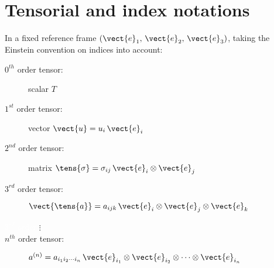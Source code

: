 \renewcommand{\arraystretch}{2.0}
\section{Tensorial and index notations}
In a fixed reference frame $ \left( \vect{e}_1 , \, \vect{e}_2 , \, \vect{e}_3  \right)$, taking the Einstein convention on indices into account:  
%
\begin{description}
\item[$0^{th}$ order tensor: ] scalar $T$ 
\item[$1^{st}$ order tensor: ] vector $\vect{u} = u_i \, \vect{e}_i  $ 
\item[$2^{nd}$ order tensor: ] matrix $\tens{ \sigma} =  \sigma_{ij}  \,\vect{e}_i \otimes \vect{e}_j$ 
\item[$3^{rd}$ order tensor: ] $\vect{\tens{a}} = a_{ijk} \, \vect{e}_i \otimes \vect{e}_j  \otimes \vect{e}_k$ 
\item[\textcolor{white}{$3^{rd}$ order } $ \vdots $]
\item[$ n^{th} $ order tensor: ]$a^{(n)} = a_{i_1 i_2 \cdots i_n} \, \vect{e}_{i_1} \otimes \vect{e}_{i_2} \otimes \cdots  \otimes \vect{e}_{i_n}$
\end{description}

